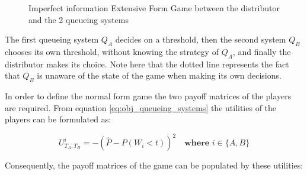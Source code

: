\begin{figure}[ht]
    \centering
    \caption{Imperfect information Extensive Form Game between the distributor 
    and the 2 queueing systems}
    \label{fig:imperfect_info_game}
\end{figure}

The first 
queueing system \(Q_A\) decides on a threshold, then the second system \(Q_B\)
chooses its own threshold, without knowing the strategy of \(Q_A\), and finally
the distributor makes its choice. Note here that the dotted line represents the
fact that \(Q_B\) is unaware of the state of the game when making its own 
decisions. 

In order to define the normal form game the two payoff matrices of the players 
are required. From equation \ref{eq:obj_queueing_systems} the utilities of the
players can be formulated as:

\begin{equation} \label{eq:payoff_entry}
    U_{T_A, T_B}^i = -\left( 
        \hat{P} - P(W_i < t) 
    \right)^2 \quad \textbf{where } i \in \{A, B\}
\end{equation}

Consequently, the payoff matrices of the game can be populated by these 
utilities:

